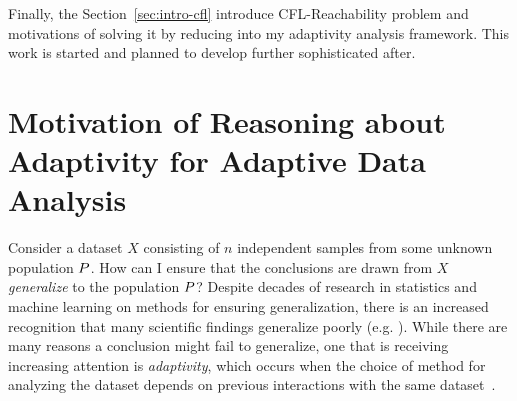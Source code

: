  Finally, the Section~\ref{sec:intro-cfl} introduce 
CFL-Reachability problem and motivations of 
solving it by reducing into my adaptivity analysis framework. 
 This work is started and planned to 
develop further sophisticated after.

\section{Motivation of Reasoning about Adaptivity for Adaptive Data Analysis}
\label{sec:intro-motivation}


Consider a dataset $X$ consisting of $n$ independent samples from some unknown population $P$. How can I ensure that the conclusions are drawn from $X$ \emph{generalize} to the population $P$? Despite decades of research in statistics and machine learning on methods for ensuring generalization, there is an increased recognition that many scientific findings generalize poorly (e.g. 
\cite{Ioannidis05,GelmanL13}
). While there are many reasons a conclusion might fail to generalize, one that is receiving increasing attention is \emph{adaptivity}, which occurs when the choice of method for analyzing the dataset depends on previous interactions with the same dataset~\cite{GelmanL13}.

